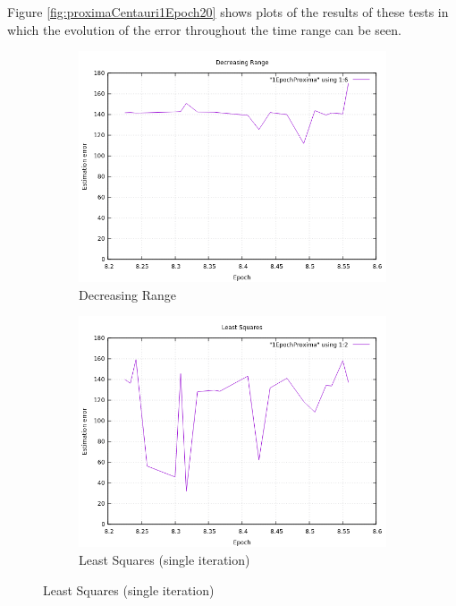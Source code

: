 Figure \ref{fig:proximaCentauri1Epoch20} shows plots of the results of these tests in which the evolution of the error throughout the time range can be seen.

\begin{figure}[!htb]
	\begin{subfigure}[b]{0.5\textwidth}
		\includegraphics[width=\linewidth]{images/resultsStellar/20Epochs1Epoch/1EpochProximaDR.png}
		\caption{Decreasing Range}
	\end{subfigure}
	\hfill
	\begin{subfigure}[b]{0.5\textwidth}
		\includegraphics[width=\linewidth]{images/resultsStellar/20Epochs1Epoch/1EpochProximaLS1.png}
		\caption{Least Squares (single iteration)}

\end{subfigure}
\end{figure}
